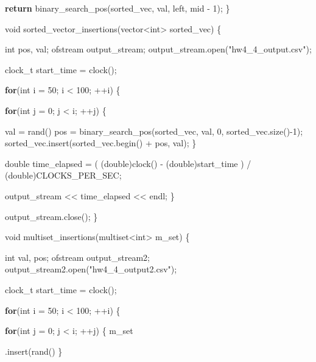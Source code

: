 \documentclass[11pt]{article}
\newenvironment{Shaded}{}{}
\newcommand{\DataTypeTok}[1]{\textcolor[rgb]{0.56,0.13,0.00}{{#1}}}
\newcommand{\DecValTok}[1]{\textcolor[rgb]{0.25,0.63,0.44}{{#1}}}
\newcommand{\StringTok}[1]{\textcolor[rgb]{0.25,0.44,0.63}{{#1}}}
\newcommand{\NormalTok}[1]{{#1}}
\newcommand{\VariableTok}[1]{\textcolor[rgb]{0.10,0.09,0.49}{{#1}}}
\newcommand{\ControlFlowTok}[1]{\textcolor[rgb]{0.00,0.44,0.13}{\textbf{{#1}}}}
\begin{document}
\begin{Shaded}
\begin{Highlighting}[]
    \ControlFlowTok{return}\NormalTok{ binary_search_pos(sorted_vec, val, left, mid - }\DecValTok{1}\NormalTok{); }
\NormalTok{\} }
 
\DataTypeTok{void}\NormalTok{ sorted_vector_insertions(vector<}\DataTypeTok{int}\NormalTok{> sorted_vec) \{}
 
    \DataTypeTok{int}\NormalTok{ pos, val;}
\NormalTok{    ofstream output_stream;}
\NormalTok{    output_stream.open(}\StringTok{"hw4_4_output.csv"}\NormalTok{);}
 
    \DataTypeTok{clock_t}\NormalTok{ start_time = clock();}
 
    \ControlFlowTok{for}\NormalTok{(}\DataTypeTok{int}\NormalTok{ i = }\DecValTok{50}\NormalTok{; i < }\DecValTok{100}\NormalTok{; ++i) \{ }
 
        \ControlFlowTok{for}\NormalTok{(}\DataTypeTok{int}\NormalTok{ j = }\DecValTok{0}\NormalTok{; j < i; ++j) \{}
\NormalTok{            val = rand() % }\DecValTok{100}\NormalTok{;}
\NormalTok{            pos = binary_search_pos(sorted_vec, val, }\DecValTok{0}\NormalTok{, sorted_vec.size()}\DecValTok{-1}\NormalTok{);}
\NormalTok{            sorted_vec.insert(sorted_vec.begin() + pos, val);}
\NormalTok{        \}}
 
        \DataTypeTok{double}\NormalTok{ time_elapsed = ( (}\DataTypeTok{double}\NormalTok{)clock() - (}\DataTypeTok{double}\NormalTok{)start_time ) /}
\NormalTok{                                (}\DataTypeTok{double}\NormalTok{)CLOCKS_PER_SEC;}
 
\NormalTok{        output_stream << time_elapsed << endl;}
\NormalTok{    \}}
 
\NormalTok{    output_stream.close();}
\NormalTok{\}}
 
\DataTypeTok{void}\NormalTok{ multiset_insertions(multiset<}\DataTypeTok{int}\NormalTok{> }\VariableTok{m_set}\NormalTok{) \{}
    
    \DataTypeTok{int}\NormalTok{ val, pos;}
\NormalTok{    ofstream output_stream2;}
\NormalTok{    output_stream2.open(}\StringTok{"hw4_4_output2.csv"}\NormalTok{);}
 
    \DataTypeTok{clock_t}\NormalTok{ start_time = clock();}
 
    \ControlFlowTok{for}\NormalTok{(}\DataTypeTok{int}\NormalTok{ i = }\DecValTok{50}\NormalTok{; i < }\DecValTok{100}\NormalTok{; ++i) \{}
 
        \ControlFlowTok{for}\NormalTok{(}\DataTypeTok{int}\NormalTok{ j = }\DecValTok{0}\NormalTok{; j < i; ++j) \{}
            \VariableTok{m_set}\NormalTok{.insert(rand() % }\DecValTok{100}\NormalTok{);}
\NormalTok{        \}}
 
}}
\end{Highlighting}
\end{Shaded}
\end{document}
